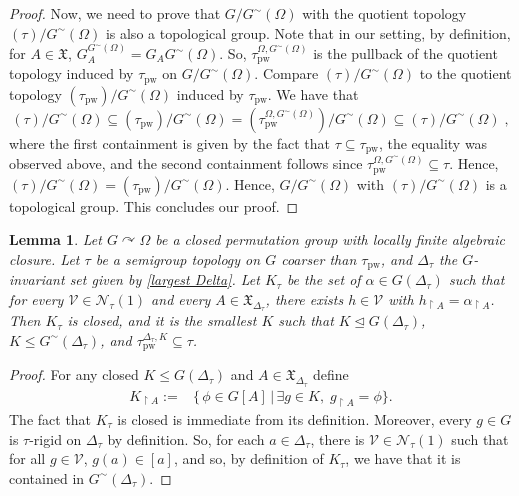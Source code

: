\documentclass{article}
\newtheorem{lemma}[theorem]{Lemma}
\theoremstyle{remark}
\theoremstyle{definition}
\def\acts{\curvearrowright}
\newcommand{\V}[0]{\mathcal{V}}
\newcommand{\pw}[0]{\tau_{\mathrm{pw}}}
\newcommand{\X}[0]{\mathfrak{X}}
\renewcommand\leq{\leqslant}
\newcommand{\gc}[0]{G^{\sim}}
\begin{document}
{{{{{\begin{proof}
{Now, we need to prove that $G/\gc(\Omega)$ with the quotient topology $(\tau)/{\gc(\Omega)}$ is also a topological group. Note that in our setting, by definition, for $A\in\X$, $G_A^{\gc(\Omega)}=G_A \gc(\Omega)$. So, $\pw^{\Omega, \gc(\Omega)}$ is the pullback of the quotient topology induced by $\pw$ on $G/\gc(\Omega)$. Compare $(\tau)/{\gc(\Omega)}$ to the quotient topology $(\pw)/{\gc(\Omega)}$ induced by $\pw$. We have that
\[(\tau)/\gc(\Omega)\subseteq (\pw)/\gc(\Omega)=\left(\pw^{\Omega, \gc(\Omega)}\right)/{\gc(\Omega)}\subseteq (\tau)/{\gc(\Omega)}\;,\]
 where the first containment is given by the fact that $\tau\subseteq\pw$, the equality was observed above, and the second containment follows since $\pw^{\Omega, \gc(\Omega)}\subseteq\tau$. Hence, $(\tau)/\gc(\Omega)=(\pw)/\gc(\Omega)$. Hence, $G/\gc(\Omega)$ with $(\tau)/\gc(\Omega)$ is a topological group. This concludes our proof.}
\end{proof}

  \begin{lemma}\label{minimal K}
  	\label{Omega0 and K0} Let $G\acts\Omega$ be a closed permutation group with locally finite algebraic closure. Let $\tau$ be a semigroup topology on $G$ coarser than $\pw$, and $\Delta_{\tau}$ the $G$-invariant set given by \cref{largest Delta}. 
    Let $K_{\tau}$ be the set of  {$\alpha\in G(\Delta_{\tau})$}
    such that for every $\V\in\mathcal{N}_{\tau}(1)$ and every $A\in\X_{\Delta_{\tau}}$, there exists $h\in\V$ with $h_{\restriction A}=\alpha_{\restriction A}$.  
   Then $K_{\tau}$ is closed, and it is the smallest $K$ such that $K\unlhd G(\Delta_{\tau})$, $K\leq {\gc(\Delta_{\tau})}$, and $\pw^{\Delta_{\tau},K}\subseteq\tau$.
  \end{lemma}

  \begin{proof}    
  	{ 
       For any closed $K\leq {G(\Delta_\tau)}$ and $A\in\X_{\Delta_{\tau}}$ define 
      \begin{align*}
        K_{\upharpoonright A}:=&\{ \,\phi\in G[A]\,|\,\exists g\in K,\;g_{\restriction A}=\phi \}.
      \end{align*}    
      The fact that $K_\tau$ is closed is immediate from {its definition}. Moreover, every $g\in G$ is $\tau$-rigid on $\Delta_\tau$ by definition. So, {for each $a\in \Delta_\tau$,} there is $\V\in\mathcal{N}_\tau(1)$ such that for all $g\in\V$, $g(a)\in[a]$, and so, by definition of $K_\tau$, we have that it is contained in $\gc(\Delta_\tau)$. 
      
}
\end{proof}}}}}}
\end{document}

